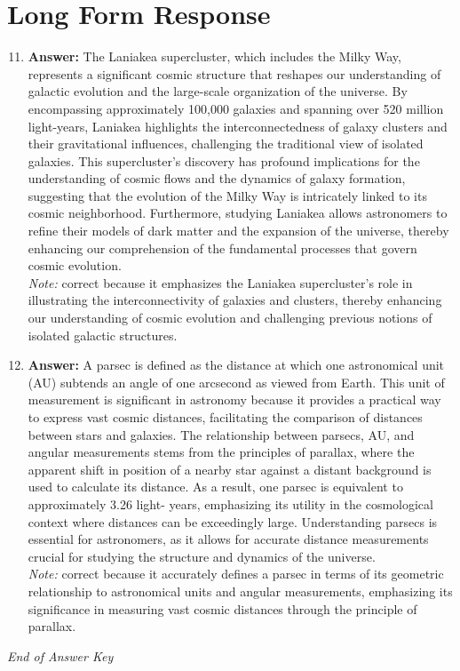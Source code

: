 \documentclass[12pt]{article}
\begin{document}
\section*{Long Form Response}
\begin{enumerate}[label=\arabic*.]
\setcounter{enumi}{10}
\item \textbf{Answer:} The Laniakea supercluster, which includes the Milky Way, represents a significant cosmic structure that reshapes our understanding of galactic evolution and the large-scale organization of the universe. By encompassing approximately 100,000 galaxies and spanning over 520 million light-years, Laniakea highlights the interconnectedness of galaxy clusters and their gravitational influences, challenging the traditional view of isolated galaxies. This supercluster's discovery has profound implications for the understanding of cosmic flows and the dynamics of galaxy formation, suggesting that the evolution of the Milky Way is intricately linked to its cosmic neighborhood. Furthermore, studying Laniakea allows astronomers to refine their models of dark matter and the expansion of the universe, thereby enhancing our comprehension of the fundamental processes that govern cosmic evolution.
\\ \textit{Note:} correct because it emphasizes the Laniakea supercluster's role in illustrating the interconnectivity of galaxies and clusters, thereby enhancing our understanding of cosmic evolution and challenging previous notions of isolated galactic structures.
\item \textbf{Answer:} A parsec is defined as the distance at which one astronomical unit (AU) subtends an angle of one arcsecond as viewed from Earth. This unit of measurement is significant in astronomy because it provides a practical way to express vast cosmic distances, facilitating the comparison of distances between stars and galaxies. The relationship between parsecs, AU, and angular measurements stems from the principles of parallax, where the apparent shift in position of a nearby star against a distant background is used to calculate its distance. As a result, one parsec is equivalent to approximately 3.26 light- years, emphasizing its utility in the cosmological context where distances can be exceedingly large. Understanding parsecs is essential for astronomers, as it allows for accurate distance measurements crucial for studying the structure and dynamics of the universe.
\\ \textit{Note:} correct because it accurately defines a parsec in terms of its geometric relationship to astronomical units and angular measurements, emphasizing its significance in measuring vast cosmic distances through the principle of parallax.
\end{enumerate}

\vfill
\noindent\textit{End of Answer Key}
\end{document}
